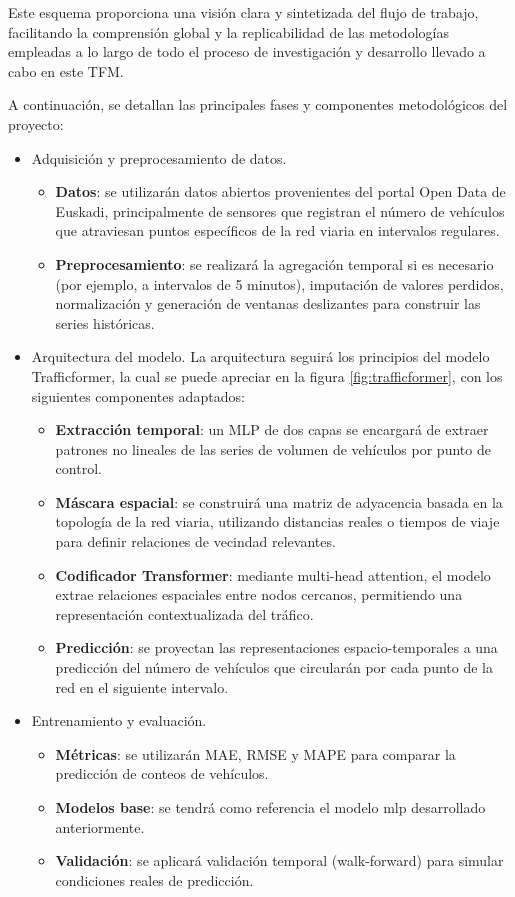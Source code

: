 Este esquema proporciona una visión clara y sintetizada del flujo de trabajo, facilitando la comprensión global y la replicabilidad de las metodologías empleadas a lo largo de todo el proceso de investigación y desarrollo llevado a cabo en este TFM.

A continuación, se detallan las principales fases y componentes metodológicos del proyecto:

\begin{itemize}
	\item Adquisición y preprocesamiento de datos.
	\begin{itemize}
		\item \textbf{Datos}: se utilizarán datos abiertos provenientes del portal Open Data de Euskadi, principalmente de sensores que registran el número de vehículos que atraviesan puntos específicos de la red viaria en intervalos regulares.
		\item \textbf{Preprocesamiento}: se realizará la agregación temporal si es necesario (por ejemplo, a intervalos de 5 minutos), imputación de valores perdidos, normalización y generación de ventanas deslizantes para construir las series históricas.
	\end{itemize}
	\item Arquitectura del modelo. La arquitectura seguirá los principios del modelo Trafficformer, la cual se puede apreciar en la figura \ref{fig:trafficformer}, con los siguientes componentes adaptados:
	\begin{itemize}
		\item \textbf{Extracción temporal}: un MLP de dos capas se encargará de extraer patrones no lineales de las series de volumen de vehículos por punto de control.
		\item \textbf{Máscara espacial}: se construirá una matriz de adyacencia basada en la topología de la red viaria, utilizando distancias reales o tiempos de viaje para definir relaciones de vecindad relevantes.
		\item \textbf{Codificador Transformer}: mediante multi-head attention, el modelo extrae relaciones espaciales entre nodos cercanos, permitiendo una representación contextualizada del tráfico.
		\item \textbf{Predicción}: se proyectan las representaciones espacio-temporales a una predicción del número de vehículos que circularán por cada punto de la red en el siguiente intervalo.
	\end{itemize}
	\item Entrenamiento y evaluación.
	\begin{itemize}
		\item \textbf{Métricas}: se utilizarán MAE, RMSE y MAPE para comparar la predicción de conteos de vehículos.
		\item \textbf{Modelos base}: se tendrá como referencia el modelo \acrshort{mlp} desarrollado anteriormente.
		\item \textbf{Validación}: se aplicará validación temporal (walk-forward) para simular condiciones reales de predicción.
	\end{itemize}
\end{itemize}


